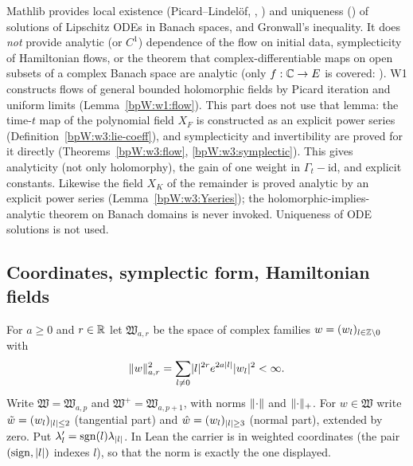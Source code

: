 \begin{remark}\label{bpW:w3:ext-flows}
Mathlib provides local existence (Picard--Lindel\"of, ,
) and uniqueness
() of solutions of Lipschitz ODEs in Banach spaces, and Gronwall's inequality. It does
\emph{not} provide analytic (or $C^1$) dependence of the flow on initial data, symplecticity of Hamiltonian flows,
or the theorem that complex-differentiable maps on open subsets of a complex Banach space are analytic (only
$f:\mathbb{C}\to E$ is covered: ). W1 constructs flows of general bounded holomorphic fields by Picard iteration and uniform limits
(Lemma~\ref{bpW:w1:flow}). This part does not use that lemma: the time-$t$ map of
the polynomial field $X_F$ is constructed as an explicit power series (Definition~\ref{bpW:w3:lie-coeff}), and
symplecticity and invertibility are proved for it directly (Theorems~\ref{bpW:w3:flow},
\ref{bpW:w3:symplectic}). This gives analyticity (not only holomorphy), the gain of one weight in
$\Gamma_t-\mathrm{id}$, and explicit constants. Likewise the field $X_K$ of the remainder is proved analytic by an
explicit power series (Lemma~\ref{bpW:w3:Yseries}); the holomorphic-implies-analytic theorem on Banach domains is
never invoked. Uniqueness of ODE solutions is not used.
\end{remark}
\endgroup

\subsection{Coordinates, symplectic form, Hamiltonian fields}\label{bpW:w3:coords-sec}

\begin{definition}\label{bpW:w3:space}
For $a\ge0$ and $r\in\mathbb{R}$ let $\mathfrak W_{a,r}$ be the space of complex families $w=(w_l)_{l\in\mathbb{Z}\setminus0}$ with
\[\lVert w\rVert_{a,r}^2=\sum_{l\ne0}\lvert l\rvert^{2r}e^{2a\lvert l\rvert}\lvert w_l\rvert^2<\infty.\]
Write $\mathfrak W=\mathfrak W_{a,p}$ and $\mathfrak W^+=\mathfrak W_{a,p+1}$, with norms $\lVert \cdot\rVert$ and
$\lVert \cdot\rVert_+$. For $w\in\mathfrak W$ write $\tilde w=(w_l)_{\lvert l\rvert\le2}$ (tangential part) and
$\hat w=(w_l)_{\lvert l\rvert\ge3}$ (normal part), extended by zero. Put $\lambda'_l=\operatorname{sgn}(l)\lambda_{\lvert l\rvert}$.
In Lean the carrier is  in weighted coordinates (the pair
$(\mathrm{sign},\lvert l\rvert)$ indexes $l$), so that the norm is exactly the one displayed.
\end{definition}


